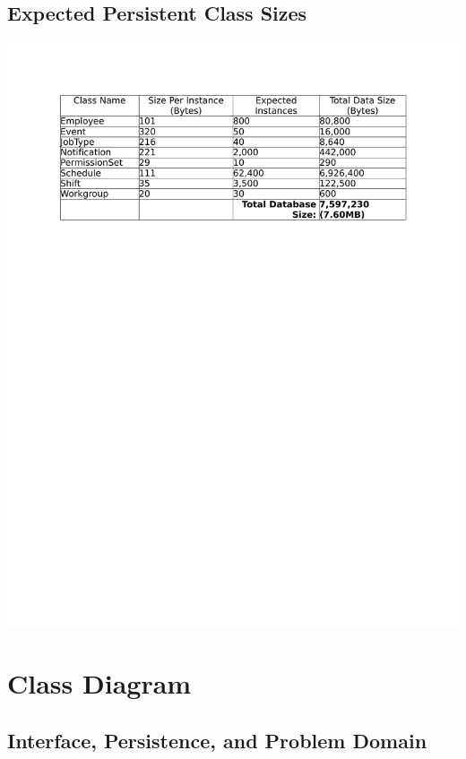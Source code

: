 \documentclass[letterpaper,12pt]{report}
\begin{document}
\section{Expected Persistent Class Sizes}
\includegraphics[trim=20mm 10mm 25mm 20mm]{externals/ExpectedPersistentClassSizes.pdf}

\chapter{Class Diagram}
\section{Interface, Persistence, and Problem Domain}
\newpage
\end{document}
